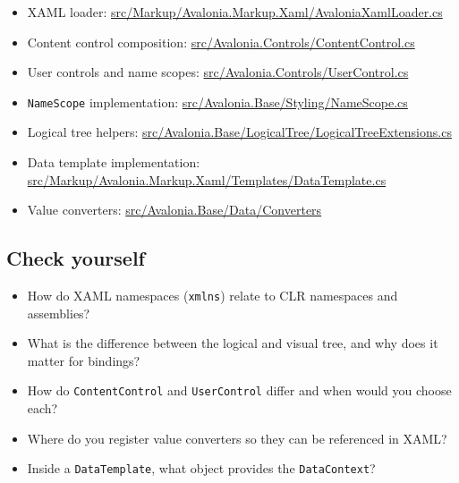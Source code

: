 \begin{itemize}
\tightlist
\item
  XAML loader:
  \href{https://github.com/AvaloniaUI/Avalonia/blob/master/src/Markup/Avalonia.Markup.Xaml/AvaloniaXamlLoader.cs}{src/Markup/Avalonia.Markup.Xaml/AvaloniaXamlLoader.cs}
\item
  Content control composition:
  \href{https://github.com/AvaloniaUI/Avalonia/blob/master/src/Avalonia.Controls/ContentControl.cs}{src/Avalonia.Controls/ContentControl.cs}
\item
  User controls and name scopes:
  \href{https://github.com/AvaloniaUI/Avalonia/blob/master/src/Avalonia.Controls/UserControl.cs}{src/Avalonia.Controls/UserControl.cs}
\item
  \passthrough{\lstinline!NameScope!} implementation:
  \href{https://github.com/AvaloniaUI/Avalonia/blob/master/src/Avalonia.Base/Styling/NameScope.cs}{src/Avalonia.Base/Styling/NameScope.cs}
\item
  Logical tree helpers:
  \href{https://github.com/AvaloniaUI/Avalonia/blob/master/src/Avalonia.Base/LogicalTree/LogicalTreeExtensions.cs}{src/Avalonia.Base/LogicalTree/LogicalTreeExtensions.cs}
\item
  Data template implementation:
  \href{https://github.com/AvaloniaUI/Avalonia/blob/master/src/Markup/Avalonia.Markup.Xaml/Templates/DataTemplate.cs}{src/Markup/Avalonia.Markup.Xaml/Templates/DataTemplate.cs}
\item
  Value converters:
  \href{https://github.com/AvaloniaUI/Avalonia/tree/master/src/Avalonia.Base/Data/Converters}{src/Avalonia.Base/Data/Converters}
\end{itemize}

\subsection{Check yourself}\label{check-yourself-1}

\begin{itemize}
\tightlist
\item
  How do XAML namespaces (\passthrough{\lstinline!xmlns!}) relate to CLR
  namespaces and assemblies?
\item
  What is the difference between the logical and visual tree, and why
  does it matter for bindings?
\item
  How do \passthrough{\lstinline!ContentControl!} and
  \passthrough{\lstinline!UserControl!} differ and when would you choose
  each?
\item
  Where do you register value converters so they can be referenced in
  XAML?
\item
  Inside a \passthrough{\lstinline!DataTemplate!}, what object provides
  the \passthrough{\lstinline!DataContext!}?
\end{itemize}

